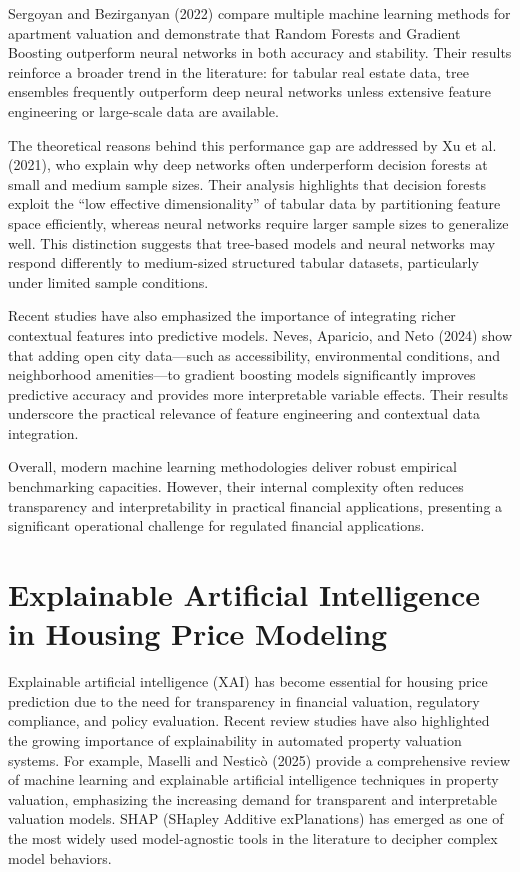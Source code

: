\documentclass[12pt,a4paper,oneside,openany]{book}
\begin{document}
Sergoyan and Bezirganyan (2022) compare multiple machine learning methods for apartment valuation and demonstrate that Random Forests and Gradient Boosting outperform neural networks in both accuracy and stability. Their results reinforce a broader trend in the literature: for tabular real estate data, tree ensembles frequently outperform deep neural networks unless extensive feature engineering or large-scale data are available.

The theoretical reasons behind this performance gap are addressed by Xu et al. (2021), who explain why deep networks often underperform decision forests at small and medium sample sizes. Their analysis highlights that decision forests exploit the ``low effective dimensionality'' of tabular data by partitioning feature space efficiently, whereas neural networks require larger sample sizes to generalize well. This distinction suggests that tree-based models and neural networks may respond differently to medium-sized structured tabular datasets, particularly under limited sample conditions.

Recent studies have also emphasized the importance of integrating richer contextual features into predictive models. Neves, Aparicio, and Neto (2024) show that adding open city data---such as accessibility, environmental conditions, and neighborhood amenities---to gradient boosting models significantly improves predictive accuracy and provides more interpretable variable effects. Their results underscore the practical relevance of feature engineering and contextual data integration.

Overall, modern machine learning methodologies deliver robust empirical benchmarking capacities. However, their internal complexity often reduces transparency and interpretability in practical financial applications, presenting a significant operational challenge for regulated financial applications.

\section{Explainable Artificial Intelligence in Housing Price Modeling}

Explainable artificial intelligence (XAI) has become essential for housing price prediction due to the need for transparency in financial valuation, regulatory compliance, and policy evaluation. Recent review studies have also highlighted the growing importance of explainability in automated property valuation systems. For example, Maselli and Nesticò (2025) provide a comprehensive review of machine learning and explainable artificial intelligence techniques in property valuation, emphasizing the increasing demand for transparent and interpretable valuation models. SHAP (SHapley Additive exPlanations) has emerged as one of the most widely used model-agnostic tools in the literature to decipher complex model behaviors.
\end{document}
